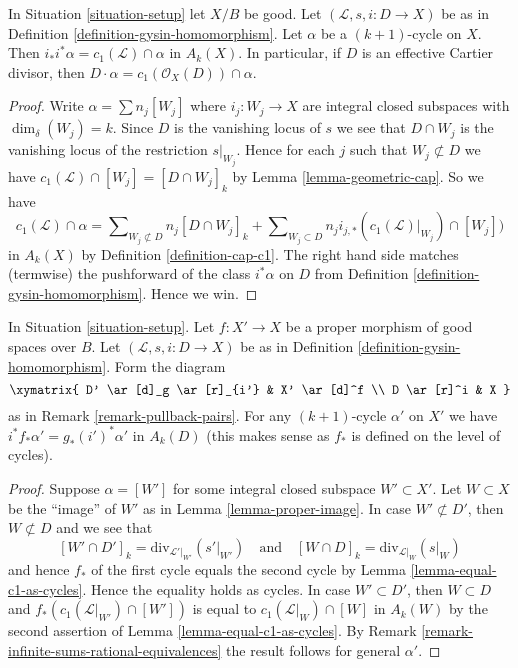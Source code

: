 \begin{lemma}
\label{lemma-support-cap-effective-Cartier}
In Situation \ref{situation-setup} let $X/B$ be good. Let
$(\mathcal{L}, s, i : D \to X)$ be as in
Definition \ref{definition-gysin-homomorphism}. Let $\alpha$ be a
$(k + 1)$-cycle on $X$. Then $i_*i^*\alpha = c_1(\mathcal{L}) \cap \alpha$
in $A_k(X)$. In particular, if $D$ is an effective Cartier divisor, then
$D \cdot \alpha = c_1(\mathcal{O}_X(D)) \cap \alpha$.
\end{lemma}

\begin{proof}
Write $\alpha = \sum n_j[W_j]$ where $i_j : W_j \to X$ are integral closed
subspaces with $\dim_\delta(W_j) = k$.
Since $D$ is the vanishing locus of $s$ we see that
$D \cap W_j$ is the vanishing locus
of the restriction $s|_{W_j}$. Hence for each $j$ such that
$W_j \not \subset D$ we have
$c_1(\mathcal{L}) \cap [W_j] = [D \cap W_j]_k$
by Lemma \ref{lemma-geometric-cap}. So we have
$$
c_1(\mathcal{L}) \cap \alpha
=
\sum\nolimits_{W_j \not \subset D} n_j[D \cap W_j]_k
+
\sum\nolimits_{W_j \subset D}
n_j i_{j, *}(c_1(\mathcal{L})|_{W_j}) \cap [W_j])
$$
in $A_k(X)$ by Definition \ref{definition-cap-c1}.
The right hand side matches (termwise) the pushforward of the class
$i^*\alpha$ on $D$ from Definition \ref{definition-gysin-homomorphism}.
Hence we win.
\end{proof}

\begin{lemma}
\label{lemma-closed-in-X-gysin}
In Situation \ref{situation-setup}. Let $f : X' \to X$ be a proper morphism
of good spaces over $B$. Let $(\mathcal{L}, s, i : D \to X)$ be as in
Definition \ref{definition-gysin-homomorphism}.
Form the diagram
$$
\xymatrix{
D' \ar[d]_g \ar[r]_{i'} & X' \ar[d]^f \\
D \ar[r]^i & X
}
$$
as in Remark \ref{remark-pullback-pairs}.
For any $(k + 1)$-cycle $\alpha'$ on $X'$ we have
$i^*f_*\alpha' = g_*(i')^*\alpha'$ in $A_k(D)$
(this makes sense as $f_*$ is defined on the level of cycles).
\end{lemma}

\begin{proof}
Suppose $\alpha = [W']$ for some integral closed subspace
$W' \subset X'$. Let $W \subset X$ be the ``image'' of $W'$
as in Lemma \ref{lemma-proper-image}. In case $W' \not \subset D'$,
then $W \not \subset D$ and we see that
$$
[W' \cap D']_k = \text{div}_{\mathcal{L}'|_{W'}}({s'|_{W'}})
\quad\text{and}\quad
[W \cap D]_k = \text{div}_{\mathcal{L}|_W}(s|_W)
$$
and hence $f_*$ of the first cycle equals the second cycle by
Lemma \ref{lemma-equal-c1-as-cycles}. Hence the
equality holds as cycles. In case $W' \subset D'$, then
$W \subset D$ and $f_*(c_1(\mathcal{L}|_{W'}) \cap [W'])$
is equal to $c_1(\mathcal{L}|_W) \cap [W]$ in $A_k(W)$ by the second
assertion of Lemma \ref{lemma-equal-c1-as-cycles}.
By Remark \ref{remark-infinite-sums-rational-equivalences}
the result follows for general $\alpha'$.
\end{proof}


